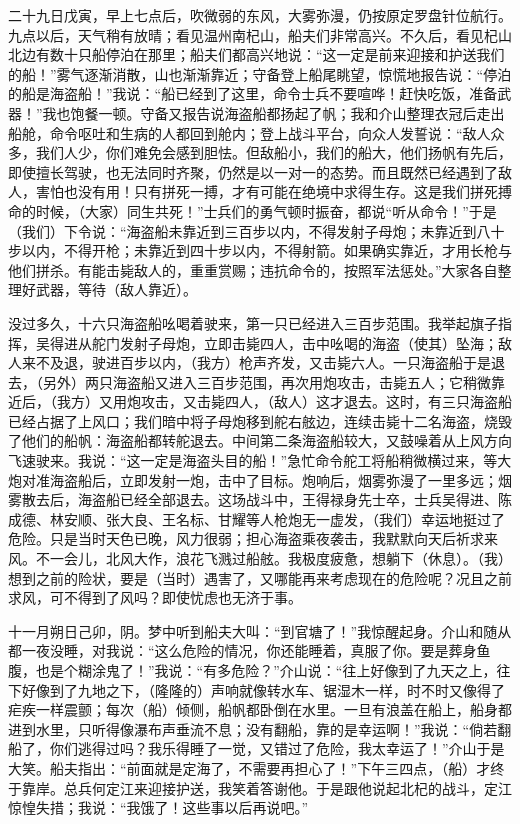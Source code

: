 \documentclass[12pt,UTF-8,openany]{ctexbook}
\begin{document}
\begin{normalsize}
    二十九日戊寅，早上七点后，吹微弱的东风，大雾弥漫，仍按原定罗盘针位航行。九点以后，天气稍有放晴；看见温州南杞山，船夫们非常高兴。不久后，看见杞山北边有数十只船停泊在那里；船夫们都高兴地说：“这一定是前来迎接和护送我们的船！”雾气逐渐消散，山也渐渐靠近；守备登上船尾眺望，惊慌地报告说：“停泊的船是海盗船！”我说：“船已经到了这里，命令士兵不要喧哗！赶快吃饭，准备武器！”我也饱餐一顿。守备又报告说海盗船都扬起了帆；我和介山整理衣冠后走出船舱，命令呕吐和生病的人都回到舱内；登上战斗平台，向众人发誓说：“敌人众多，我们人少，你们难免会感到胆怯。但敌船小，我们的船大，他们扬帆有先后，即使擅长驾驶，也无法同时齐聚，仍然是以一对一的态势。而且既然已经遇到了敌人，害怕也没有用！只有拼死一搏，才有可能在绝境中求得生存。这是我们拼死搏命的时候，（大家）同生共死！”士兵们的勇气顿时振奋，都说“听从命令！”于是（我们）下令说：“海盗船未靠近到三百步以内，不得发射子母炮；未靠近到八十步以内，不得开枪；未靠近到四十步以内，不得射箭。如果确实靠近，才用长枪与他们拼杀。有能击毙敌人的，重重赏赐；违抗命令的，按照军法惩处。”大家各自整理好武器，等待（敌人靠近）。
    
    没过多久，十六只海盗船吆喝着驶来，第一只已经进入三百步范围。我举起旗子指挥，吴得进从舵门发射子母炮，立即击毙四人，击中吆喝的海盗（使其）坠海；敌人来不及退，驶进百步以内，（我方）枪声齐发，又击毙六人。一只海盗船于是退去，（另外）两只海盗船又进入三百步范围，再次用炮攻击，击毙五人；它稍微靠近后，（我方）又用炮攻击，又击毙四人，（敌人）这才退去。这时，有三只海盗船已经占据了上风口；我们暗中将子母炮移到舵右舷边，连续击毙十二名海盗，烧毁了他们的船帆：海盗船都转舵退去。中间第二条海盗船较大，又鼓噪着从上风方向飞速驶来。我说：“这一定是海盗头目的船！”急忙命令舵工将船稍微横过来，等大炮对准海盗船后，立即发射一炮，击中了目标。炮响后，烟雾弥漫了一里多远；烟雾散去后，海盗船已经全部退去。这场战斗中，王得禄身先士卒，士兵吴得进、陈成德、林安顺、张大良、王名标、甘耀等人枪炮无一虚发，（我们）幸运地挺过了危险。只是当时天色已晚，风力很弱；担心海盗乘夜袭击，我默默向天后祈求来风。不一会儿，北风大作，浪花飞溅过船舷。我极度疲惫，想躺下（休息）。（我）想到之前的险状，要是（当时）遇害了，又哪能再来考虑现在的危险呢？况且之前求风，可不得到了风吗？即使忧虑也无济于事。
    
    十一月朔日己卯，阴。梦中听到船夫大叫：“到官塘了！”我惊醒起身。介山和随从都一夜没睡，对我说：“这么危险的情况，你还能睡着，真服了你。要是葬身鱼腹，也是个糊涂鬼了！”我说：“有多危险？”介山说：“往上好像到了九天之上，往下好像到了九地之下，（隆隆的）声响就像转水车、锯湿木一样，时不时又像得了疟疾一样震颤；每次（船）倾侧，船帆都卧倒在水里。一旦有浪盖在船上，船身都进到水里，只听得像瀑布声垂流不息；没有翻船，靠的是幸运啊！”我说：“倘若翻船了，你们逃得过吗？我乐得睡了一觉，又错过了危险，我太幸运了！”介山于是大笑。船夫指出：“前面就是定海了，不需要再担心了！”下午三四点，（船）才终于靠岸。总兵何定江来迎接护送，我笑着答谢他。于是跟他说起北杞的战斗，定江惊惶失措；我说：“我饿了！这些事以后再说吧。”
    
\end{normalsize}
\end{document}
